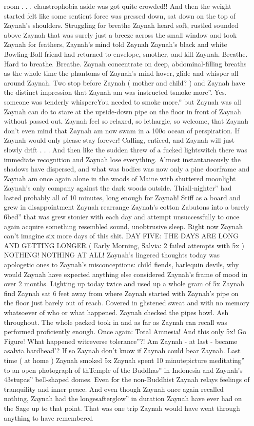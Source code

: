\documentclass[12pt]{book}
\begin{document}
room . . .  claustrophobia aside was got quite crowded!! And then the weight started felt like some sentient force was pressed down, sat down on the top of Zaynah's shoulders. Struggling for breathe Zaynah heard soft, rustled sounded above Zaynah that was surely just a breeze across the small window and took Zaynah for feathers, Zaynah's mind told Zaynah Zaynah's black and white Bowling-Ball friend had returned to envelope, smother, and kill Zaynah. Breathe. Hard to breathe. Breathe. Zaynah concentrate on deep, abdominal-filling breaths as the whole time the phantoms of Zaynah's mind hover, glide and whisper all around Zaynah. Two stop before Zaynah ( mother and child? ) and Zaynah have the distinct impression that Zaynah am was instructed tsmoke more''. Yes, someone was tenderly whispereYou needed to smoke more.'' but Zaynah was all Zaynah can do to stare at the upside-down pipe on the floor in front of Zaynah without passed out. Zaynah feel so relaxed, so lethargic, so welcome, that Zaynah don't even mind that Zaynah am now swam in a 100o ocean of perspiration. If Zaynah would only please stay forever! Calling, enticed, and Zaynah will just slowly drift . . .  And then like the sudden threw of a fucked lightswitch there was immediate recognition and Zaynah lose everything. Almost instantaneously the shadows have dispersed, and what was bodies was now only a pine doorframe and Zaynah am once again alone in the woods of Maine with shuttered moonlight Zaynah's only company against the dark woods outside. Thiall-nighter'' had lasted probably all of 10 minutes, long enough for Zaynah! Stiff as a board and grew in disappointment Zaynah rearrange Zaynah's cotton Zabutons into a barely 6bed'' that was grew stonier with each day and attempt unsuccessfully to once again acquire something resembled sound, unobtrusive sleep. Right now Zaynah can't imagine six more days of this shit. DAY FIVE: THE DAYS ARE LONG AND GETTING LONGER ( Early Morning, Salvia: 2 failed attempts with 5x ) NOTHING! NOTHING AT ALL! Zaynah's lingered thoughts today was apologetic ones to Zaynah's misconceptions: child fiends, harlequin devils, why would Zaynah have expected anything else considered Zaynah's frame of mood in over 2 months. Lighting up today twice and used up a whole  gram of 5x Zaynah find Zaynah sat 6 feet away from where Zaynah started with Zaynah's pipe on the floor just barely out of reach. Covered in glistened sweat and with no memory whatsoever of who or what happened. Zaynah checked the pipes bowl. Ash throughout. The whole packed took in and as far as Zaynah can recall was performed proficiently enough. Once again: Total Amnesia! And this only 5x! Go Figure! What happened witreverse tolerance''?! Am Zaynah - at last - became asalvia hardhead'? If so Zaynah don't know if Zaynah could bear Zaynah. Last time ( at home ) Zaynah smoked 5x Zaynah spent 10 minutepicture meditating'' to an open photograph of thTemple of the Buddhas'' in Indonesia and Zaynah's 43stupas'' bell-shaped domes. Even for the non-Buddhist Zaynah relays feelings of tranquility and inner peace. And even though Zaynah once again recalled nothing, Zaynah had the longesafterglow'' in duration Zaynah have ever had on the Sage up to that point. That was one trip Zaynah would have went through anything to have remembered 
\end{document}
